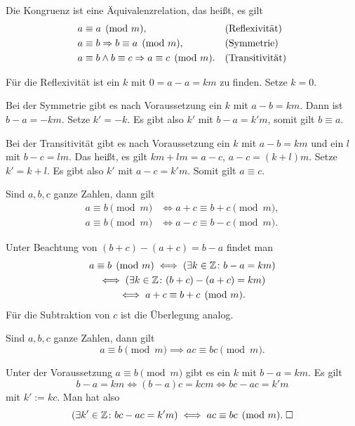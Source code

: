 \begin{Satz}
Die Kongruenz ist eine Äquivalenzrelation, das heißt, es gilt
\begin{align*}
&a\equiv a\pmod{m},&&\text{(Reflexivität)}\\
&a\equiv b\Rightarrow b\equiv a\pmod{m},&&\text{(Symmetrie)}\\
&a\equiv b\land b\equiv c\Rightarrow a\equiv c\pmod{m}.&&\text{(Transitivität)}
\end{align*}
\end{Satz}
\begin{Beweis}
Für die Reflexivität ist ein $k$ mit $0=a-a=km$
zu finden. Setze $k=0$.

Bei der Symmetrie gibt es nach Voraussetzung
ein $k$ mit $a-b=km$. Dann ist $b-a=-km$. Setze $k'=-k$.
Es gibt also $k'$ mit $b-a=k'm$, somit gilt $b\equiv a$.

Bei der Transitivität gibt es nach Voraussetzung ein $k$ mit
$a-b=km$ und ein $l$ mit $b-c=lm$. Das heißt, es gilt
$km+lm = a-c$,  $a-c = (k+l)m$. Setze $k'=k+l$. Es gibt also
$k'$ mit $a-c=k'm$. Somit gilt $a\equiv c$.\;\qedsymbol
\end{Beweis}

\begin{Satz}\label{Kongruenz-add-sub}
Sind $a,b,c$ ganze Zahlen, dann gilt
\begin{align*}
a\equiv b\pmod{m}&\iff a+c\equiv b+c\pmod{m},\\
a\equiv b\pmod{m}&\iff a-c\equiv b-c\pmod{m}.
\end{align*}
\end{Satz}
\begin{Beweis}
Unter Beachtung von $(b+c)-(a+c)=b-a$ findet man
\begin{gather*}
a\equiv b\pmod{m}
\iff (\exists k\in\mathbb Z\colon b-a=km)\\
\iff (\exists k\in\mathbb Z\colon (b+c)-(a+c)=km)\\
\iff a+c\equiv b+c\pmod{m}.
\end{gather*}
Für die Subtraktion von $c$ ist die Überlegung analog.\;\qedsymbol
\end{Beweis}

\begin{Satz}\label{Kongruenz-mul}
Sind $a,b,c$ ganze Zahlen, dann gilt
\[a\equiv b\pmod{m} \implies ac\equiv bc\pmod{m}.\]
\end{Satz}
\begin{Beweis}
Unter der Voraussetzung $a\equiv b\pmod{m}$ gibt es ein
$k$ mit $b-a=km$. Es gilt
\[b-a=km\iff (b-a)c=kcm \iff bc-ac=k'm\]
mit $k':=kc$. Man hat also
\[(\exists k'\in\mathbb Z\colon bc-ac=k'm)\iff ac\equiv bc\pmod{m}.\;\Box\]
\end{Beweis}


